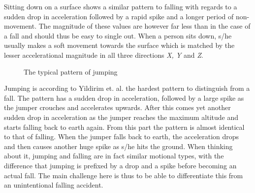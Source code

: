 \documentclass[12pt, a4paper, onecolumn]{article}
\begin{document}
		\noindent Sitting down on a surface shows a similar pattern to falling with regards to a sudden drop in acceleration followed by  a rapid spike and a longer period of non-movement. The magnitude of these values are however far less than in the case of a fall and should thus be easy to single out. When a person sits down, s/he usually makes a soft movement towards the surface which is matched by the lesser accelerational  magnitude in all three directions \textit{X, Y} and \textit{Z}.
	
	
		\begin{figure}[h]
			\centering
			\caption{The typical pattern of jumping}%
			\label{fig:example}%
		\end{figure}
	
		\noindent Jumping is according to Yildirim et. al. the hardest pattern to distinguish from a fall. The pattern has a sudden drop in acceleration, followed by a large spike as the jumper crouches and accelerates upwards. After this comes yet another sudden drop in acceleration as the jumper reaches the maximum altitude and starts falling back to earth again. From this part the pattern is almost identical to that of falling. When the jumper falls back to earth, the acceleration drops and then causes another huge spike as s/he hits the ground. When thinking about it, jumping and falling are in fact similar motional types, with the difference that jumping is prefixed by a drop and a spike before becoming an actual fall. The main challenge here is thus to be able to differentiate this from an unintentional falling accident.
		
		
\end{document}
